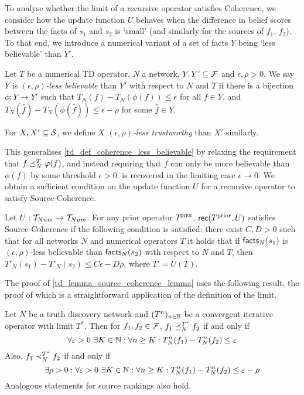 To analyse whether the limit of a recursive operator satisfies Coherence, we
consider how the update function $U$ behaves when the difference in belief
scores between the facts of $s_1$ and $s_2$ is `small' (and similarly for the
sources of $f_1$, $f_2$). To that end, we introduce a numerical variant of a
set of facts $Y$ being `less believable' than $Y'$.

\begin{definition}
\label{td_def_num_less_believable}

Let $T$ be a numerical TD operator, $N$ a network, $Y, Y' \subseteq \F$ and
$\epsilon, \rho > 0$.  We say $Y$ is \emph{$(\epsilon, \rho)$-less believable}
than $Y'$ with respect to $N$ and $T$ if there is a bijection $\phi: Y \to Y'$
such that $T_N(f) - T_N(\phi(f)) \le \epsilon$ for all $f \in Y$, and
$T_N(\hat{f})
- T_N(\phi(\hat{f})) \le \epsilon - \rho$ for some $\hat{f} \in Y$.

For $X, X' \subseteq \S$, we define $X$ \emph{$(\epsilon, \rho)$-less
trustworthy} than $X'$ similarly.

\end{definition}

This generalises \cref{td_def_coherence_less_believable} by relaxing the
requirement that ${f \fle_N^T \phi(f)}$, and instead requiring that $f$ can
only be more believable than $\phi(f)$ by some threshold $\epsilon > 0$.
 is recovered in the limiting
case $\epsilon \to 0$. We obtain a sufficient condition on the update function
$U$ for a recursive operator to satisfy Source-Coherence.

\begin{lemma}
\label{td_lemma_source_coherence_lemma}

Let $U: \num \to \num$. For any prior operator $T^{\text{prior}}$,
$\rec(T^{\text{prior}}, U)$ satisfies Source-Coherence if the following
condition is satisfied: there exist $C, D > 0$ such that for all networks $N$
and numerical operators $T$ it holds that if $\facts_N(s_1)$ is $(\epsilon,
\rho)$-less believable than $\facts_N(s_2)$ with respect to $N$ and $T$, then
    $T'_N(s_1) - T'_N(s_2) \le C\epsilon - D\rho$,
where $T' = U(T)$.

\end{lemma}

The proof of \cref{td_lemma_source_coherence_lemma} uses the following
result, the proof of which is a straightforward application of the definition
of the limit.

\begin{lemma}
\label{td_lemma_ordering_epsilon_lemma}
Let $N$ be a truth discovery network and $(T^n)_{n \in \Nat}$ be a convergent
iterative operator with limit $T^*$. Then for $f_1, f_2 \in \F$, $f_1 \fle_N^{T^*} f_2$
if and only if
\[
    \forall \epsilon > 0\ \exists K \in \Nat : \forall n \ge K:
        T_N^n(f_1) - T_N^n(f_2) \le \epsilon
\]
Also, $f_1 \flt_N^{T^*} f_2$ if and only if
\[
    \exists \rho > 0 : \forall \epsilon > 0\ \exists K \in \Nat : \forall n \ge K:
        T_N^n(f_1) - T_N^n(f_2) \le \epsilon - \rho
\]
Analogous statements for source rankings also hold.
\end{lemma}


